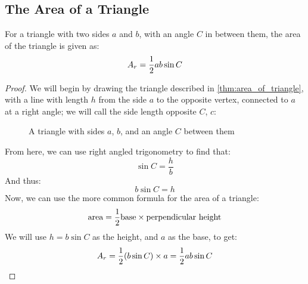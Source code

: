     \subsection{The Area of a Triangle}
        \begin{theorem} \label{thm:area_of_triangle}
            For a triangle with two sides $a$ and $b$, with an angle $C$ in between them, the area of the triangle is given as:
            \begin{equation}
                A_r=\frac{1}{2} ab\sin C
            \end{equation}
        \end{theorem}
        \begin{proof}
            We will begin by drawing the triangle described in \ref{thm:area_of_triangle}, with a line with length $h$ from the side $a$ to the opposite vertex, connected to $a$ at a right angle; we will call the side length opposite $C$, $c$:
            \begin{figure}
                \begin{center}
                    \caption{A triangle with sides $a$, $b$, and an angle $C$ between them}
                \end{center}
            \end{figure}
            From here, we can use right angled trigonometry to find that:
            \begin{equation}
                \sin C=\frac{h}{b}
            \end{equation}
            And thus:
            \begin{equation}
                b\sin C=h
            \end{equation}
            Now, we can use the more common formula for the area of a triangle:
            \begin{equation}
                \text{area}=\frac{1}{2}\text{base}\times\text{perpendicular height}
            \end{equation}
            We will use $h=b\sin C$ as the height, and $a$ as the base, to get:
            \begin{equation}
                A_r=\frac{1}{2}(b\sin C)\times a=\frac{1}{2} ab\sin C
            \end{equation}
        \end{proof}

